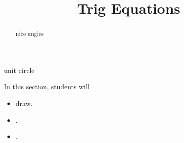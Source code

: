 \documentclass{ximera}
\title{Trig Equations}
\begin{document}
\begin{abstract}
nice angles
\end{abstract}
\maketitle




unit circle


























\begin{sectionOutcomes}
In this section, students will 

\begin{itemize}
\item draw.
\item .
\item .
\end{itemize}
\end{sectionOutcomes}
\end{document}
